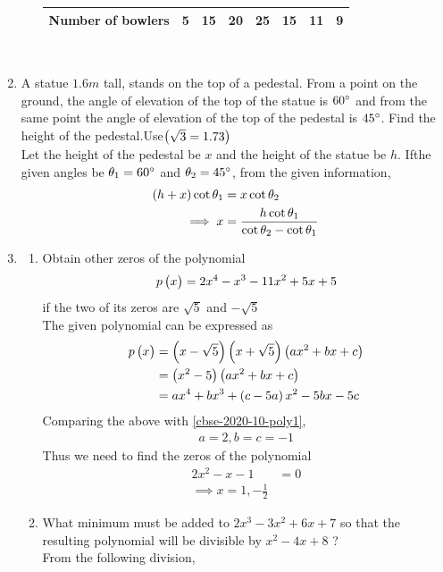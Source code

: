 \documentclass[journal,12pt,twocolumn]{IEEEtran}
\begin{document}
\begin{enumerate}[label=4.\arabic*]
\begin{enumerate}
{\begin{tabular}{|l|c|c|c|c|c|c|c|}
        \hline
        Number of bowlers & 5 & 15 & 20 & 25 & 15 & 11 & 9\\
        \hline
    \end{tabular}
    }    
    \vspace{2mm}\\
    \end{enumerate}
    \item A statue $1.6m$ tall, stands on the top of a pedestal. From a point on the ground,  the angle of elevation of the top of the statue is $60\degree$ and from the same point the angle of elevation of the top of the pedestal is $45\degree$. Find the height of the pedestal.Use$\begin{pmatrix}\sqrt{3} = 1.73\end{pmatrix}$\\
	    \solution Let the height of the pedestal be $x$ and the height of the statue be $h$. Ifthe given angles be $\theta_1 = 60 \degree$ and $\theta_2 = 45 \degree$,  from the given information, 
\begin{align}
	\left(h + x \right)\cot \theta_1 &= x \cot \theta_2
	\\
	\implies x &= \frac{h\cot \theta_1}{\cot \theta_2-\cot \theta_1}
\end{align}
	    

    
    \item \begin{enumerate}
        \item  Obtain other zeros of the polynomial
		\begin{align}
			\label{cbse-2020-10-poly1}
p \begin{pmatrix}x\end{pmatrix} = 2x^4 - x^3 - 11x^2 + 5x + 5
		\end{align}
    if the two of its zeros are $\sqrt{5}$ and $- \sqrt{5}$\\
    \solution The given polynomial can be expressed as
		\begin{align}
			p \begin{pmatrix}x\end{pmatrix} 
			&= \left(x - \sqrt{5}\right)\left(x + \sqrt{5}\right)\left(ax^2 + bx + c \right)
			\\
			&= \left(x^2 - 5\right)\left(ax^2 + bx + c \right)
			\\
			&= ax^4 +bx^3 +\left(c-5a\right)x^2 -5bx -5c
		\end{align}
			Comparing the above with \eqref{cbse-2020-10-poly1}, 
		\begin{align}
			a = 2, b = c = -1
		\end{align}
		Thus we need to find the zeros of the polynomial 
		\begin{align}
			2x^2 -x -1 &= 0
			\\
			\implies x = 1, -\frac{1}{2}
		\end{align}
        \item What minimum must be added to $2x^3 - 3x^2 + 6x + 7$ so that the resulting polynomial will be divisible by $x^2 - 4x + 8$ ?\\
		\solution  From the following division,


\end{enumerate}
\end{enumerate}
\end{document}
